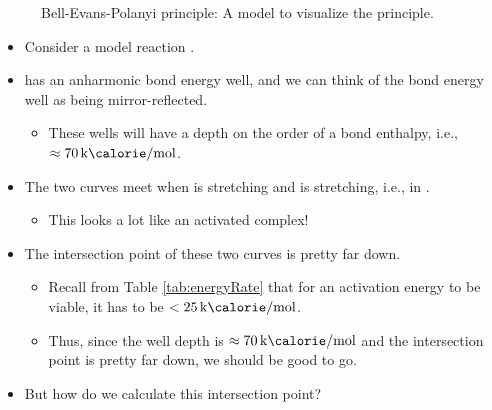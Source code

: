 \documentclass[../notes.tex]{subfiles}
\begin{document}
\begin{itemize}
\begin{figure}[h!]
        \caption{Bell-Evans-Polanyi principle: A model to visualize the principle.}
        \label{fig:BEPmodel}
    \end{figure}
    \pagebreak
    \begin{itemize}
        \item Consider a model reaction .
        \item {} has an anharmonic bond energy well, and we can think of the  bond energy well as being mirror-reflected.
        \begin{itemize}
            \item These wells will have a depth on the order of a bond enthalpy, i.e., $\approx\kcal{70}$.
        \end{itemize}
        \item The two curves meet when  is stretching and  is stretching, i.e., in .
        \begin{itemize}
            \item This looks a lot like an activated complex!
        \end{itemize}
        \item The intersection point of these two curves is pretty far down.
        \begin{itemize}
            \item Recall from Table \ref{tab:energyRate} that for an activation energy to be viable, it has to be $<\kcal{25}$.
            \item Thus, since the well depth is $\approx\kcal{70}$ and the intersection point is pretty far down, we should be good to go.
        \end{itemize}
        \item But how do we calculate this intersection point?

\end{itemize}
\end{itemize}
\end{document}
